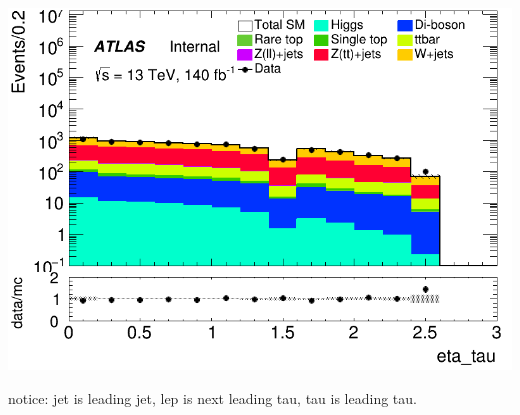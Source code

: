 \documentclass[usenames,dvipsnames]{beamer}
\begin{document}
\begin{frame}
    \hfill
    \begin{minipage}{0.32\textwidth}
        \centering
        \includegraphics[width=\textwidth]{graphics/HH_met/HH_met_eta_tau.png}
    \end{minipage}
    notice: jet is leading jet, lep is next leading tau, tau is leading tau.
\end{frame}
\end{document}
